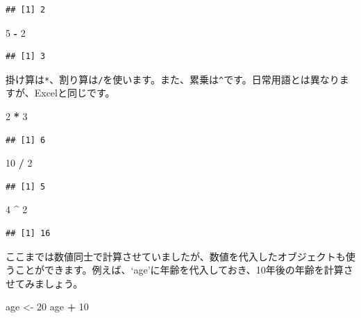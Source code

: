 \documentclass[]{book}
\newenvironment{Shaded}{\begin{snugshade}}{\end{snugshade}}
\newcommand{\DecValTok}[1]{\textcolor[rgb]{0.00,0.00,0.81}{#1}}
\newcommand{\StringTok}[1]{\textcolor[rgb]{0.31,0.60,0.02}{#1}}
\newcommand{\OperatorTok}[1]{\textcolor[rgb]{0.81,0.36,0.00}{\textbf{#1}}}
\newcommand{\NormalTok}[1]{#1}
\begin{document}
\begin{verbatim}
## [1] 2
\end{verbatim}

\begin{Shaded}
\begin{Highlighting}[]
\DecValTok{5} \OperatorTok{-}\StringTok{ }\DecValTok{2}
\end{Highlighting}
\end{Shaded}

\begin{verbatim}
## [1] 3
\end{verbatim}

掛け算は\texttt{*}、割り算は\texttt{/}を使います。また、累乗は\texttt{\^{}}です。日常用語とは異なりますが、Excelと同じです。

\begin{Shaded}
\begin{Highlighting}[]
\DecValTok{2} \OperatorTok{*}\StringTok{ }\DecValTok{3}
\end{Highlighting}
\end{Shaded}

\begin{verbatim}
## [1] 6
\end{verbatim}

\begin{Shaded}
\begin{Highlighting}[]
\DecValTok{10} \OperatorTok{/}\StringTok{ }\DecValTok{2}
\end{Highlighting}
\end{Shaded}

\begin{verbatim}
## [1] 5
\end{verbatim}

\begin{Shaded}
\begin{Highlighting}[]
\DecValTok{4} \OperatorTok{^}\StringTok{ }\DecValTok{2}
\end{Highlighting}
\end{Shaded}

\begin{verbatim}
## [1] 16
\end{verbatim}

ここまでは数値同士で計算させていましたが、数値を代入したオブジェクトも使うことができます。例えば、`age'に年齢を代入しておき、10年後の年齢を計算させてみましょう。

\begin{Shaded}
\begin{Highlighting}[]
\NormalTok{age <-}\StringTok{ }\DecValTok{20}
\NormalTok{age }\OperatorTok{+}\StringTok{ }\DecValTok{10}
\end{Highlighting}
\end{Shaded}
\end{document}
